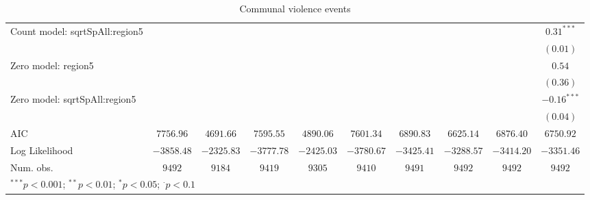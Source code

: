 \begin{sidewaystable}
\begin{center}
{\begin{tabular}{l c c c c c c c c c}
Count model: sqrtSpAll:region5 &               &               &               &               &                &               &               &                & $0.31^{***}$   \\
                               &               &               &               &               &                &               &               &                & $(0.01)$       \\
Zero model: region5            &               &               &               &               &                &               &               &                & $0.54$         \\
                               &               &               &               &               &                &               &               &                & $(0.36)$       \\
Zero model: sqrtSpAll:region5  &               &               &               &               &                &               &               &                & $-0.16^{***}$  \\
                               &               &               &               &               &                &               &               &                & $(0.04)$       \\
\midrule
AIC                            & $7756.96$     & $4691.66$     & $7595.55$     & $4890.06$     & $7601.34$      & $6890.83$     & $6625.14$     & $6876.40$      & $6750.92$      \\
Log Likelihood                 & $-3858.48$    & $-2325.83$    & $-3777.78$    & $-2425.03$    & $-3780.67$     & $-3425.41$    & $-3288.57$    & $-3414.20$     & $-3351.46$     \\
Num. obs.                      & $9492$        & $9184$        & $9419$        & $9305$        & $9410$         & $9491$        & $9492$        & $9492$         & $9492$         \\
\bottomrule
\multicolumn{10}{l}{\scriptsize{$^{***}p<0.001$; $^{**}p<0.01$; $^{*}p<0.05$; $^{\cdot}p<0.1$}}
\end{tabular}
}
\caption{Communal violence events}
\label{zorg3}
\end{center}
\end{sidewaystable}
